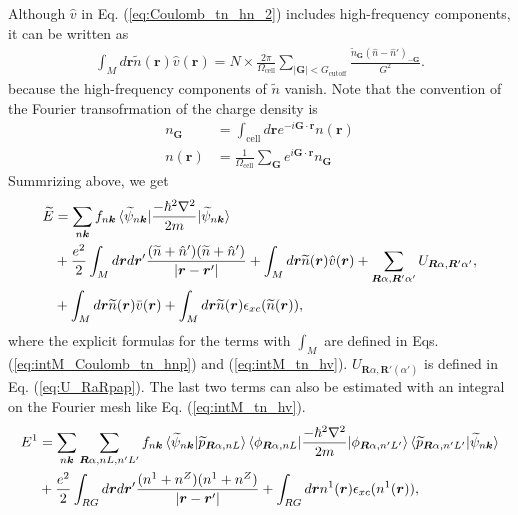 \documentclass{article}
\begin{document}
Although $\hat{v}$ in Eq. (\ref{eq:Coulomb_tn_hn_2}) includes high-frequency components, it can be written as
\begin{align}
  \int_M d\bm{r} \widetilde{n} (\bm{r}) \hat{v}(\bm{r}) 
  =
  N\times \frac{2\pi}{\Omega_{\text{cell}}} \sum_{|\bm{G}| < G_{\text{cutoff}} } \frac{\widetilde{n}_{\bm{G}}(\hat{n} - \hat{n}')_{-\bm{G}}}{G^2}.
  \label{eq:intM_tn_hv}
\end{align}
because the high-frequency components of $\widetilde{n}$ vanish.
Note that the convention of the Fourier transofrmation of the charge density is
\begin{align}
  n_{\bm{G}} &= \int_{\text{cell}}d \bm{r} e^{-i\bm{G}\cdot \bm{r}} n(\bm{r})
  \\
  n(\bm{r}) &= \frac{1}{\Omega_{\text{cell}}} \sum_{\bm{G}} e^{i\bm{G}\cdot \bm{r}} n_{\bm{G}} 
\end{align}
Summrizing above, we get
\begin{align} 
  \widetilde{E} &= 
  \sum_{n\bm{k}} f_{n\bm{k}} \braket{\widetilde{\psi}_{n\bm{k}} | \frac{-\hbar^2\nabla^2}{2m} |\widetilde{\psi}_{n\bm{k}} }
  \nonumber
  \\&
  + \frac{e^2}{2}\int_M d\bm{r}d\bm{r}' \frac{(\widetilde{n} + \hat{n}')(\widetilde{n} + \hat{n}')}{|\bm{r}-\bm{r}'|}
  + \int_M d\bm{r} \widetilde{n} (\bm{r}) \hat{v}(\bm{r}) 
  + \sum_{\bm{R}\alpha, \bm{R}'\alpha'} U_{\bm{R}\alpha,\bm{R}'\alpha'},
  \nonumber
  \\&
  + \int_M d\bm{r} \widetilde{n}(\bm{r})\bar{v}(\bm{r})
  + \int_M d\bm{r} \widetilde{n}(\bm{r})\epsilon_{xc}(\widetilde{n}(\bm{r})),
  \label{eq:tildeE_numerical_calculation}
\end{align}
where the explicit formulas for the terms with $\int_M$ are defined in Eqs. (\ref{eq:intM_Coulomb_tn_hnp}) and (\ref{eq:intM_tn_hv}). $U_{\bm{R}\alpha,\bm{R}'(\alpha')}$ is defined in Eq. (\ref{eq:U_RaRpap}).
The last two terms can also be estimated with an integral on the Fourier mesh like Eq. (\ref{eq:intM_tn_hv}).
\begin{align} 
  {E}^1 &= 
  \sum_{n\bm{k}} \sum_{\bm{R}\alpha, nL, n'L'}f_{n\bm{k}} 
  \braket{\widetilde{\psi}_{n\bm{k}} | \widetilde{p}_{\bm{R}\alpha, nL}}
  \braket{\phi_{\bm{R}\alpha, nL}| \frac{-\hbar^2\nabla^2}{2m} |\phi_{\bm{R}\alpha, n'L'}}
  \braket{\widetilde{p}_{\bm{R}\alpha, n'L'}|\widetilde{\psi}_{n\bm{k}} }
  \nonumber\\&
  + \frac{e^2}{2}\int_{RG} d\bm{r}d\bm{r}' \frac{({n}^1 + n^Z)({n}^1 + n^Z)}{|\bm{r}-\bm{r}'|}
  + \int_{RG} d\bm{r} {n}^1(\bm{r})\epsilon_{xc}({n}^1(\bm{r})),
  \label{eq:E1_numerical_calculation}
\end{align}
\end{document}
